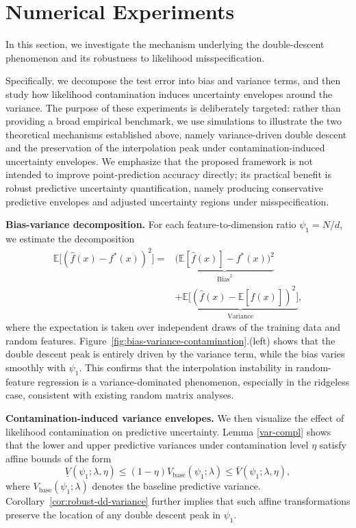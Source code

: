 \documentclass[12pt, english, oneside, a4paper]{article}
\begin{document}
\section{Numerical Experiments}\label{sec:experiments}


In this section, we investigate the mechanism underlying the double-descent phenomenon and its robustness to likelihood misspecification.

Specifically, we decompose the test error into bias and variance terms, and then study how likelihood contamination induces uncertainty envelopes around the variance.
The purpose of these experiments is deliberately targeted: rather than providing a broad empirical benchmark, we use simulations to illustrate the two theoretical mechanisms established above, namely variance-driven double descent and the preservation of the interpolation peak under contamination-induced uncertainty envelopes.
We emphasize that the proposed framework is not intended to improve point-prediction accuracy directly; its practical benefit is robust predictive uncertainty quantification, namely producing conservative predictive envelopes and adjusted uncertainty regions under misspecification.

\textbf{Bias-variance decomposition.} 
For each feature-to-dimension ratio $\psi_1 = N/d$, we estimate the decomposition
\begin{align*}
\mathbb{E}\big[(\hat f(x) - f^{*}(x))^2\big]=&\underbrace{\big(\mathbb{E}[\hat f(x)] - f^{*}(x)\big)^2}_{\text{Bias}^2}\\ &+
\underbrace{\mathbb{E}\big[(\hat f(x) - \mathbb{E}[\hat f(x)])^2\big]}_{\text{Variance}},
\end{align*}
where the expectation is taken over independent draws of the training data and random
features.
Figure~\ref{fig:bias-variance-contamination}.(left) shows that the double descent peak is
entirely driven by the variance term, while the bias varies smoothly with $\psi_1$.
This confirms that the interpolation instability in random-feature regression is a variance-dominated phenomenon, especially in the ridgeless case, consistent with existing random matrix analyses.

\textbf{Contamination-induced variance envelopes.}
We then visualize the effect of likelihood contamination on predictive uncertainty.
Lemma \ref{var-compl} shows that the lower and upper predictive variances under contamination level
$\eta$ satisfy affine bounds of the form
\[
\underline V(\psi_1;\lambda,\eta)
 \le 
(1-\eta) V_{\mathrm{base}}(\psi_1;\lambda)
 \le 
\overline V(\psi_1;\lambda,\eta),
\]
where $V_{\mathrm{base}}(\psi_1;\lambda)$ denotes the baseline predictive variance.
Corollary~\ref{cor:robust-dd-variance} further implies that such affine transformations preserve the location of
any double descent peak in $\psi_1$.
\end{document}
